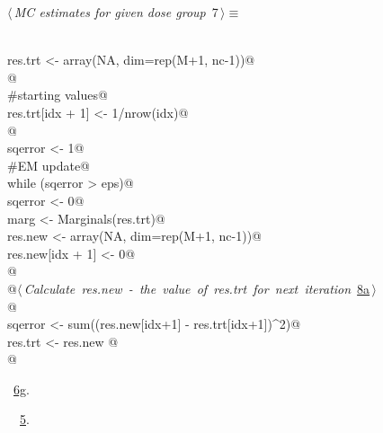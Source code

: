 \documentclass[reqno]{amsart}
\renewcommand{\NWtarget}[2]{\hypertarget{#1}{#2}}
\renewcommand{\NWlink}[2]{\hyperlink{#1}{#2}}
\begin{document}
\begin{flushleft} \small\label{scrap32}\raggedright\small
\NWtarget{nuweb7}{} $\langle\,${\itshape MC estimates for given dose group}\nobreak\ {\footnotesize {7}}$\,\rangle\equiv$
\vspace{-1ex}
\begin{list}{}{} \item
\mbox{}\verb@@\\
\mbox{}\verb@  res.trt <- array(NA, dim=rep(M+1, nc-1))@\\
\mbox{}\verb@   @\\
\mbox{}\verb@  #starting values@\\
\mbox{}\verb@  res.trt[idx + 1] <- 1/nrow(idx)@\\
\mbox{}\verb@  @\\
\mbox{}\verb@  sqerror <- 1@\\
\mbox{}\verb@  #EM update@\\
\mbox{}\verb@  while (sqerror > eps){@\\
\mbox{}\verb@        sqerror <- 0@\\
\mbox{}\verb@        marg <- Marginals(res.trt)@\\
\mbox{}\verb@    res.new <- array(NA, dim=rep(M+1, nc-1))@\\
\mbox{}\verb@    res.new[idx + 1] <- 0@\\
\mbox{}\verb@    @\\
\mbox{}\verb@    @\hbox{$\langle\,${\itshape Calculate res.new - the value of res.trt for next iteration}\nobreak\ {\footnotesize \NWlink{nuweb8a}{8a}}$\,\rangle$}\verb@@\\
\mbox{}\verb@        @\\
\mbox{}\verb@    sqerror <- sum((res.new[idx+1] - res.trt[idx+1])^2)@\\
\mbox{}\verb@        res.trt <- res.new @\\
\mbox{}\verb@  }@\\
\mbox{}\verb@@{\NWsep}
\end{list}
\vspace{-1.5ex}
\footnotesize
\begin{list}{}{\setlength{\itemsep}{-\parsep}\setlength{\itemindent}{-\leftmargin}}
\item \NWtxtMacroRefIn\ \NWlink{nuweb6g}{6g}.
\item \NWtxtIdentsUsed\nobreak\  \verb@Marginals@\nobreak\ \NWlink{nuweb5}{5}.
\item{}
\end{list}
\vspace{4ex}
\end{flushleft}
\end{document}

